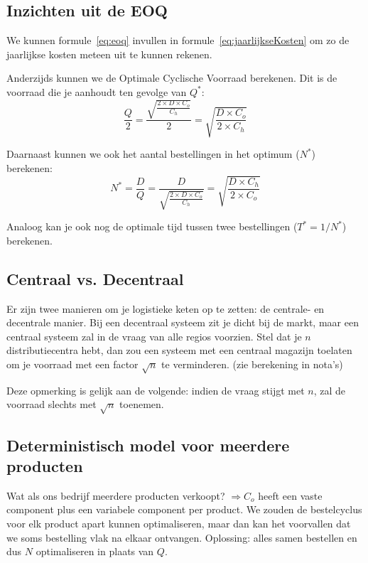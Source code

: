 \subsection{Inzichten uit de EOQ}
We kunnen formule~\ref{eq:eoq} invullen in formule~\ref{eq:jaarlijkseKosten} om zo de jaarlijkse kosten meteen uit te kunnen rekenen.

Anderzijds kunnen we de Optimale Cyclische Voorraad berekenen. Dit is de voorraad die je aanhoudt ten gevolge van $Q^*$:
\begin{equation}
    \frac{Q}{2} = \frac{\sqrt{\frac{2 \times D \times C_o}{C_h}}}{2} = \sqrt{\frac{D \times C_o}{2 \times C_h}}
\end{equation}

Daarnaast kunnen we ook het aantal bestellingen in het optimum ($N^*$) berekenen:
\begin{equation}
    N^* = \frac{D}{Q} = \frac{D}{\sqrt{\frac{2 \times D \times C_o}{C_h}}} = \sqrt{\frac{D \times C_h}{2 \times C_o}}
\end{equation}

Analoog kan je ook nog de optimale tijd tussen twee bestellingen ($T^* = 1 / N^*$) berekenen.

\subsection{Centraal vs. Decentraal}
\label{ssec:Centraal vs. Decentraal}
Er zijn twee manieren om je logistieke keten op te zetten: de centrale- en decentrale manier. Bij een decentraal systeem zit je dicht bij de markt, maar een centraal systeem zal in de vraag van alle regios voorzien. Stel dat je $n$ distributiecentra hebt, dan zou een systeem met een centraal magazijn toelaten om je voorraad met een factor $\sqrt{n}$ te verminderen. (zie berekening in nota's)

Deze opmerking is gelijk aan de volgende: indien de vraag stijgt met $n$, zal de voorraad slechts met $\sqrt{n}$ toenemen.

\subsection{Deterministisch model voor meerdere producten}
Wat als ons bedrijf meerdere producten verkoopt? $\Rightarrow C_o$ heeft een vaste component plus een variabele component per product. We zouden de bestelcyclus voor elk product apart kunnen optimaliseren, maar dan kan het voorvallen dat we soms bestelling vlak na elkaar ontvangen. Oplossing: alles samen bestellen en dus $N$ optimaliseren in plaats van $Q$.

